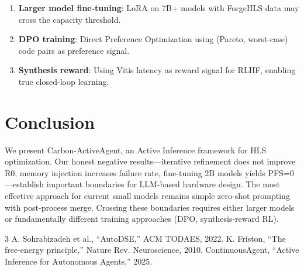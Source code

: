 \documentclass[conference]{IEEEtran}
\begin{document}
\begin{enumerate}
    \item \textbf{Larger model fine-tuning}: LoRA on 7B+ models
    with ForgeHLS data may cross the capacity threshold.
    \item \textbf{DPO training}: Direct Preference Optimization
    using (Pareto, worst-case) code pairs as preference signal.
    \item \textbf{Synthesis reward}: Using Vitis latency as reward
    signal for RLHF, enabling true closed-loop learning.
\end{enumerate}

\section{Conclusion}

We present Carbon-ActiveAgent, an Active Inference framework for
HLS optimization. Our honest negative results---iterative refinement
does not improve R0, memory injection increases failure rate,
fine-tuning 2B models yields PFS=0---establish important boundaries
for LLM-based hardware design. The most effective approach for
current small models remains simple zero-shot prompting with
post-process merge. Crossing these boundaries requires either
larger models or fundamentally different training approaches
(DPO, synthesis-reward RL).


\begin{thebibliography}{3}
 A. Sohrabizadeh et al., ``AutoDSE,'' ACM TODAES, 2022.
 K. Friston, ``The free-energy principle,'' Nature Rev. Neuroscience, 2010.
 ContinuousAgent, ``Active Inference for Autonomous Agents,'' 2025.
\end{thebibliography}
\end{document}
